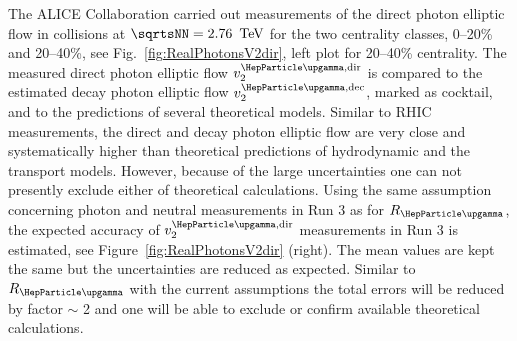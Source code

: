 The ALICE Collaboration carried out measurements of the direct photon elliptic flow \cite{Acharya:2018bdy} in \PbPb{} collisions at $\sqrtsNN=\unit[2.76]{\UTeV}$ for the two centrality classes, 0--20\% and 20--40\%, see Fig.~\ref{fig:RealPhotonsV2dir}, left plot for 20--40\% centrality.
The measured direct photon elliptic flow $v_2^{\PGg,\rm dir}$ is compared to the estimated decay photon elliptic flow $v_2^{\PGg,\rm dec}$, marked as cocktail, and to the predictions of several theoretical models. Similar to RHIC measurements, the direct and decay photon elliptic flow are very close and systematically higher than theoretical predictions of hydrodynamic  \cite{Gale:2014dfa,Chatterjee:2017akg} and the transport  \cite{Linnyk:2015tha} models. However, because of the large uncertainties one can not presently exclude either of theoretical calculations. Using the same assumption concerning photon and neutral measurements in Run 3 as for $R_{\PGg}$, the expected accuracy of $v_2^{\PGg,\rm dir}$ measurements in Run 3 is estimated, see Figure~\ref{fig:RealPhotonsV2dir} (right). The mean values are kept the same but the uncertainties are reduced as expected. Similar to $R_{\PGg}$ with the current assumptions the total errors will be reduced by factor $\sim$ 2 and one will be able to exclude or confirm available theoretical calculations.





